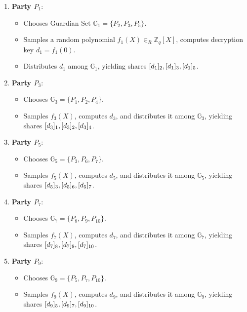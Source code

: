 \documentclass[lettersize,journal]{IEEEtran}
\theoremstyle{definition}
\begin{document}
\begin{enumerate}
    \item \textbf{Party $P_1$}:
        \begin{itemize}
            \item Chooses Guardian Set $\mathbb{G}_1 = \{P_2, P_3, P_5\}$.
            \item Samples a random polynomial $f_1(X) \in_R \mathbb{Z}_q[X]$, computes decryption key $d_1 = f_1(0)$.
            \item Distributes $d_1$ among $\mathbb{G}_1$, yielding shares $[d_{1}]_{2}, [d_{1}]_{3}, [d_{1}]_{5}$.
        \end{itemize}

    \item \textbf{Party $P_3$}:
        \begin{itemize}
            \item Chooses $\mathbb{G}_3 = \{P_1, P_2, P_4\}$.
            \item Samples $f_3(X)$, computes $d_3$, and distributes it among $\mathbb{G}_3$, yielding shares $[d_{3}]_{1}, [d_{3}]_{2}, [d_{3}]_{4}$.
        \end{itemize}

    \item \textbf{Party $P_5$}:
        \begin{itemize}
            \item Chooses $\mathbb{G}_5 = \{P_3, P_6, P_7\}$.
            \item Samples $f_5(X)$, computes $d_5$, and distributes it among $\mathbb{G}_5$, yielding shares $[d_{5}]_{3}, [d_{5}]_{6}, [d_{5}]_{7}$.
        \end{itemize}

    \item \textbf{Party $P_7$}:
        \begin{itemize}
            \item Chooses $\mathbb{G}_7 = \{P_8, P_9, P_{10}\}$.
            \item Samples $f_7(X)$, computes $d_7$, and distributes it among $\mathbb{G}_7$, yielding shares $[d_{7}]_{8}, [d_{7}]_{9}, [d_{7}]_{10}$.
        \end{itemize}

    \item \textbf{Party $P_9$}:
        \begin{itemize}
            \item Chooses $\mathbb{G}_9 = \{P_5, P_7, P_{10}\}$.
            \item Samples $f_9(X)$, computes $d_9$, and distributes it among $\mathbb{G}_9$, yielding shares $[d_{9}]_{5},[d_{9}]_{7}, [d_{9}]_{10}$.
        \end{itemize}
\end{enumerate}
\end{document}
